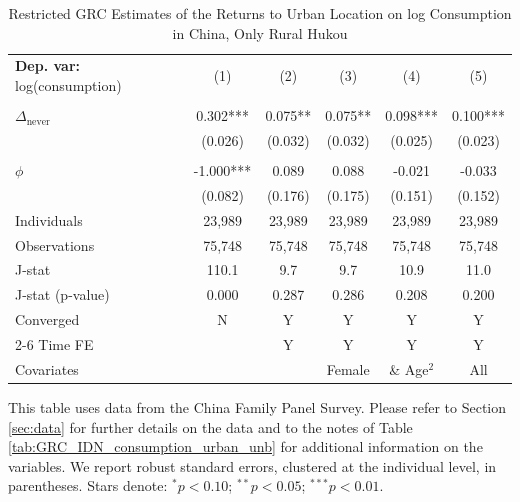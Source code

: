 \begin{table}[htbp] \centering \begin{threeparttable}
 \caption{Restricted GRC Estimates of the Returns to Urban Location on log Consumption in China, Only Rural Hukou} 
 \label{tab:GRC_CHN_rural_consumption_urban_unb_r} 
\begin{tabular}{l ccccc} \toprule  \textbf{Dep. var:}  log(consumption) 
                    &\multicolumn{1}{c}{(1)}   &\multicolumn{1}{c}{(2)}   &\multicolumn{1}{c}{(3)}   &\multicolumn{1}{c}{(4)}   &\multicolumn{1}{c}{(5)}   \\
                    &               &               &               &               &               \\
\addlinespace
$\Delta_{\text{never}}$&       0.302***&       0.075** &       0.075** &       0.098***&       0.100***\\
                    &     (0.026)   &     (0.032)   &     (0.032)   &     (0.025)   &     (0.023)   \\
                    &               &               &               &               &               \\
\addlinespace
$\phi$              &      -1.000***&       0.089   &       0.088   &      -0.021   &      -0.033   \\
                    &     (0.082)   &     (0.176)   &     (0.175)   &     (0.151)   &     (0.152)   \\
\addlinespace
Individuals         &      23,989   &      23,989   &      23,989   &      23,989   &      23,989   \\
Observations        &      75,748   &      75,748   &      75,748   &      75,748   &      75,748   \\
J-stat              &       110.1   &         9.7   &         9.7   &        10.9   &        11.0   \\
J-stat (p-value)    &       0.000   &       0.287   &       0.286   &       0.208   &       0.200   \\
Converged           &           N   &           Y   &           Y   &           Y   &           Y   \\
\cmidrule{2-6} Time FE & & Y & Y & Y & Y \\ Covariates & & & Female & \& Age$^2$ & All \\ \bottomrule \end{tabular} \begin{tablenotes}[flushleft] \footnotesize \item{This table uses data from the China Family Panel Survey. Please refer to Section \ref{sec:data} for further details on the data and to the notes of Table \ref{tab:GRC_IDN_consumption_urban_unb} for additional information on the variables. We report robust standard errors, clustered at the individual level, in parentheses. Stars denote: $^{*} p<0.10$; $^{**} p<0.05$; $^{***} p<0.01$.} \end{tablenotes} \end{threeparttable} \end{table}
